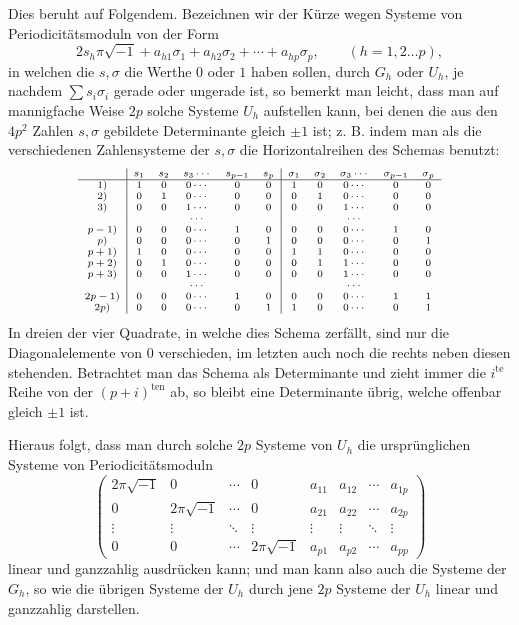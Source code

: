 \documentclass[10pt]{article}
\begin{document}
Dies beruht auf Folgendem. Bezeichnen wir der Kürze wegen Systeme von Periodicitätsmoduln von der Form
\[
2s_h\pi\sqrt{-1}+a_{h1}\sigma_1+a_{h2}\sigma_2+\cdots+a_{hp}\sigma_p,
\qquad (h=1,2\ldots p),
\]
in welchen die \(s,\sigma\) die Werthe \(0\) oder \(1\) haben sollen, durch \(G_h\) oder \(U_h\), je nachdem \(\sum s_i\sigma_i\) gerade oder ungerade ist, so bemerkt man leicht, dass man auf mannigfache Weise \(2p\) solche Systeme \(U_h\) aufstellen kann, bei denen die aus den \(4p^2\) Zahlen \(s,\sigma\) gebildete Determinante gleich \(\pm1\) ist; z. B. indem man als die verschiedenen Zahlensysteme der \(s,\sigma\) die Horizontalreihen des Schemas benutzt:
\[
\scriptsize
\begin{array}{c|ccccc|ccccc}
& s_1&s_2&s_3\cdots&s_{p-1}&s_p
& \sigma_1&\sigma_2&\sigma_3\cdots&\sigma_{p-1}&\sigma_p\\ \hline
1)   &1&0&0\cdots&0&0&1&0&0\cdots&0&0\\
2)   &0&1&0\cdots&0&0&0&1&0\cdots&0&0\\
3)   &0&0&1\cdots&0&0&0&0&1\cdots&0&0\\
     & & &\cdots& & & & &\cdots& &\\
p-1) &0&0&0\cdots&1&0&0&0&0\cdots&1&0\\
p)   &0&0&0\cdots&0&1&0&0&0\cdots&0&1\\
p+1) &1&0&0\cdots&0&0&1&1&0\cdots&0&0\\
p+2) &0&1&0\cdots&0&0&0&1&1\cdots&0&0\\
p+3) &0&0&1\cdots&0&0&0&0&1\cdots&0&0\\
     & & &\cdots& & & & &\cdots& &\\
2p-1)&0&0&0\cdots&1&0&0&0&0\cdots&1&1\\
2p)  &0&0&0\cdots&0&1&1&0&0\cdots&0&1
\end{array}
\]
In dreien der vier Quadrate, in welche dies Schema zerfällt, sind nur die Diagonalelemente von \(0\) verschieden, im letzten auch noch die rechts neben diesen stehenden. Betrachtet man das Schema als Determinante und zieht immer die \(i^{\text{te}}\) Reihe von der \((p+i)^{\text{ten}}\) ab, so bleibt eine Determinante übrig, welche offenbar gleich \(\pm1\) ist.

Hieraus folgt, dass man durch solche \(2p\) Systeme von \(U_h\) die ursprünglichen Systeme von Periodicitätsmoduln
\[
\left(
\begin{array}{cccc|cccc}
2\pi\sqrt{-1}&0&\cdots&0&a_{11}&a_{12}&\cdots&a_{1p}\\
0&2\pi\sqrt{-1}&\cdots&0&a_{21}&a_{22}&\cdots&a_{2p}\\
\vdots&\vdots&\ddots&\vdots&\vdots&\vdots&\ddots&\vdots\\
0&0&\cdots&2\pi\sqrt{-1}&a_{p1}&a_{p2}&\cdots&a_{pp}
\end{array}
\right)
\]
linear und ganzzahlig ausdrücken kann; und man kann also auch die Systeme der \(G_h\), so wie die übrigen Systeme der \(U_h\) durch jene \(2p\) Systeme der \(U_h\) linear und ganzzahlig darstellen.
\end{document}
